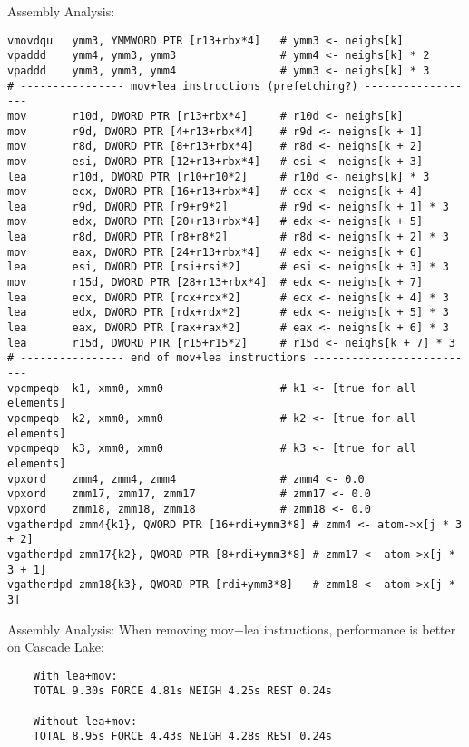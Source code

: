 \documentclass[aspectratio=43,t]{beamer}
\begin{document}
  \begin{frame}[fragile]{Assembly Analysis:}
    \begin{lstlisting}[basicstyle=\tt\tiny]
vmovdqu   ymm3, YMMWORD PTR [r13+rbx*4]   # ymm3 <- neighs[k]
vpaddd    ymm4, ymm3, ymm3                # ymm4 <- neighs[k] * 2
vpaddd    ymm3, ymm3, ymm4                # ymm3 <- neighs[k] * 3
# ---------------- mov+lea instructions (prefetching?) ------------------
mov       r10d, DWORD PTR [r13+rbx*4]     # r10d <- neighs[k]
mov       r9d, DWORD PTR [4+r13+rbx*4]    # r9d <- neighs[k + 1]
mov       r8d, DWORD PTR [8+r13+rbx*4]    # r8d <- neighs[k + 2]
mov       esi, DWORD PTR [12+r13+rbx*4]   # esi <- neighs[k + 3]
lea       r10d, DWORD PTR [r10+r10*2]     # r10d <- neighs[k] * 3
mov       ecx, DWORD PTR [16+r13+rbx*4]   # ecx <- neighs[k + 4]
lea       r9d, DWORD PTR [r9+r9*2]        # r9d <- neighs[k + 1] * 3
mov       edx, DWORD PTR [20+r13+rbx*4]   # edx <- neighs[k + 5]
lea       r8d, DWORD PTR [r8+r8*2]        # r8d <- neighs[k + 2] * 3
mov       eax, DWORD PTR [24+r13+rbx*4]   # edx <- neighs[k + 6]
lea       esi, DWORD PTR [rsi+rsi*2]      # esi <- neighs[k + 3] * 3
mov       r15d, DWORD PTR [28+r13+rbx*4]  # edx <- neighs[k + 7]
lea       ecx, DWORD PTR [rcx+rcx*2]      # ecx <- neighs[k + 4] * 3
lea       edx, DWORD PTR [rdx+rdx*2]      # edx <- neighs[k + 5] * 3
lea       eax, DWORD PTR [rax+rax*2]      # eax <- neighs[k + 6] * 3
lea       r15d, DWORD PTR [r15+r15*2]     # r15d <- neighs[k + 7] * 3
# ---------------- end of mov+lea instructions --------------------------
vpcmpeqb  k1, xmm0, xmm0                  # k1 <- [true for all elements]
vpcmpeqb  k2, xmm0, xmm0                  # k2 <- [true for all elements]
vpcmpeqb  k3, xmm0, xmm0                  # k3 <- [true for all elements]
vpxord    zmm4, zmm4, zmm4                # zmm4 <- 0.0
vpxord    zmm17, zmm17, zmm17             # zmm17 <- 0.0
vpxord    zmm18, zmm18, zmm18             # zmm18 <- 0.0
vgatherdpd zmm4{k1}, QWORD PTR [16+rdi+ymm3*8] # zmm4 <- atom->x[j * 3 + 2]
vgatherdpd zmm17{k2}, QWORD PTR [8+rdi+ymm3*8] # zmm17 <- atom->x[j * 3 + 1]
vgatherdpd zmm18{k3}, QWORD PTR [rdi+ymm3*8]   # zmm18 <- atom->x[j * 3]
    \end{lstlisting}
  \end{frame}

  \begin{frame}[fragile]{Assembly Analysis:}
    When removing mov+lea instructions, performance is better on Cascade Lake:
    \begin{verbatim}
    With lea+mov:
    TOTAL 9.30s FORCE 4.81s NEIGH 4.25s REST 0.24s

    Without lea+mov:
    TOTAL 8.95s FORCE 4.43s NEIGH 4.28s REST 0.24s
    \end{verbatim}
  \end{frame}
\end{document}
